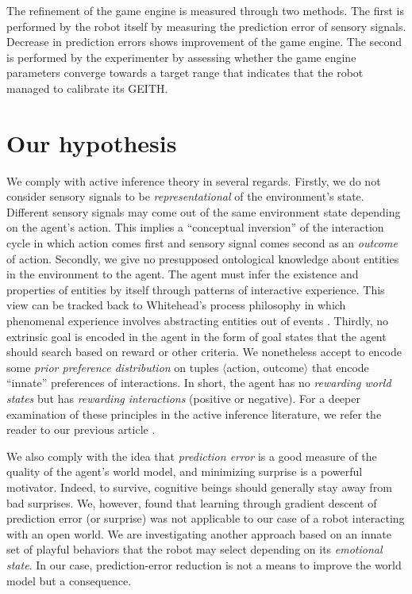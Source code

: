 \documentclass[runningheads]{llncs}
\begin{document}
The refinement of the game engine is measured through two methods. 
The first is performed by the robot itself by measuring the prediction error of sensory signals. 
Decrease in prediction errors shows improvement of the game engine. 
The second is performed by the experimenter by assessing whether the game engine parameters converge towards a target range that indicates that the robot managed to calibrate its GEITH. 




\section{Our hypothesis}

We comply with active inference theory in several regards. 
Firstly, we do not consider sensory signals to be \textit{representational} of the environment's state. 
Different sensory signals may come out of the same environment state depending on the agent's action. 
This implies a ``conceptual inversion'' of the interaction cycle in which action comes first and sensory signal comes second as an  \textit{outcome} of action. 
Secondly, we give no presupposed ontological knowledge about entities in the environment to the agent. 
The agent must infer the existence and properties of entities by itself through patterns of interactive experience. 
This view can be tracked back to Whitehead's process philosophy in which phenomenal experience involves abstracting entities out of events \cite{whitehead1929}. 
Thirdly, no extrinsic goal is encoded in the agent in the form of goal states that the agent should search based on reward or other criteria. 
We nonetheless accept to encode some \textit{prior preference distribution} on tuples $\langle$action, outcome$\rangle$ that encode ``innate'' preferences of interactions. 
In short, the agent has no \textit{rewarding world states} but has \textit{rewarding interactions} (positive or negative).
For a deeper examination of these principles in the active inference literature, we refer the reader to our previous article \cite{georgeon_artificial_2024}.

We also comply with the idea that \textit{prediction error} is a good measure of the quality of the agent's world model, and minimizing surprise is a powerful motivator. 
Indeed, to survive, cognitive beings should generally stay away from bad surprises.
We, however, found that learning through gradient descent of prediction error (or surprise) was not applicable to our case of a robot interacting with an open world. 
We are investigating another approach based on an innate set of playful behaviors that the robot may select depending on its \textit{emotional state}.  
In our case, prediction-error reduction is not a means to improve the world model but a consequence.
\end{document}
